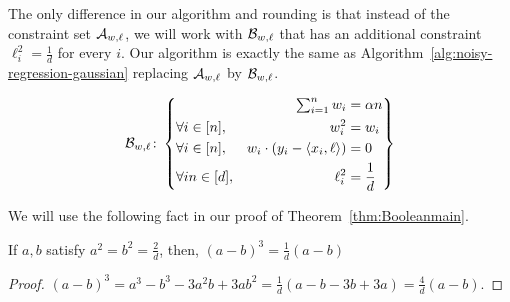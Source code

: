



The only  difference in our algorithm and rounding is that instead of the constraint set $\mathcal A_{w,\ell}$, we will work with $\mathcal B_{w,\ell}$  that has an additional constraint $\ell_i^2 = \frac{1}{d}$ for every $i$. Our algorithm is exactly the same as Algorithm~\ref{alg:noisy-regression-gaussian} replacing $\mathcal A_{w,\ell}$ by $\mathcal B_{w,\ell}$.

\begin{equation}
  \mathcal B_{w,\ell}\colon
  \left \{
    \begin{aligned}
      &&
      \textstyle\sum_{i=1}^n w_i
      &= \alpha n\\
      &\forall i\in [n],
      & w_i^2
      & =w_i \\
      &\forall i\in [n],
      & w_i \cdot (y_i - \langle x_i,\ell\rangle)
      & = 0\\
      &\forall in \in [d],
      &\ell_i^2 &= \frac{1}{d}\\
    \end{aligned}
  \right \}
\end{equation} 

We will use the following fact in our proof of Theorem~\ref{thm:Booleanmain}.

\begin{lemma}
If $a,b$ satisfy $a^2 = b^2 = \frac{2}{d}$, then, 
$
(a- b)^{3} = \frac{1}{d} (a - b)
$ \label{lem:simple-cubic}
\end{lemma}
\begin{proof}
$(a-b)^3 = a^3 - b^3 - 3a^2 b + 3ab^2 = \frac{1}{d}(a-b-3b+3a) = \frac{4}{d}(a-b)$.
\end{proof}





